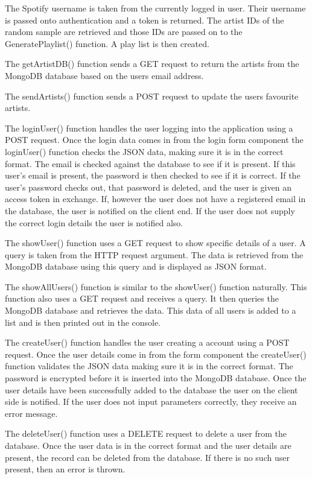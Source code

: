 The Spotify username is taken from the currently logged in user. Their username is passed onto authentication and a token is returned. The artist IDs of the random sample are retrieved and those IDs are passed on to the GeneratePlaylist() function. A play list is then created.

The getArtistDB() function sends a GET request to return the artists from the MongoDB database based on the users email address.

The sendArtists() function sends a POST request to update the users favourite artists.

The loginUser() function handles the user logging into the application using a POST request. Once the login data comes in from the login form component the loginUser() function checks the JSON data, making sure it is in the correct format. The email is checked against the database to see if it is present. If this user’s email is present, the password is then checked to see if it is correct.  If the user’s password checks out, that password is deleted, and the user is given an access token in exchange. 
If, however the user does not have a registered email in the database, the user is notified on the client end. If the user does not supply the correct login details the user is notified also.

The showUser() function uses a GET request to show specific details of a user. A query is taken from the HTTP request argument. The data is retrieved from the MongoDB database using this query and is displayed as JSON format.

The showAllUsers() function is similar to the showUser() function  naturally. This function also uses a GET request and receives a query. It then queries the MongoDB database and retrieves the data. This data of all users is added to a list and is then printed out in the console.

The createUser() function handles the user creating a account using a POST request. Once the user details come in from the form component the createUser() function validates the JSON data making sure it is in the correct format. The password is encrypted before it is inserted into the MongoDB database. Once the user details have been successfully added to the database the user on the client side is notified. If the user does not input parameters correctly, they receive an error message.

The deleteUser() function uses a DELETE request to delete a user from the database. Once the user data is in the correct format and the user details are present, the record can be deleted from the database. If there is no such user present, then an error is thrown.

